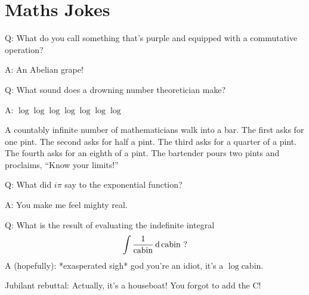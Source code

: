 \section{Maths Jokes}

Q: What do you call something that's purple and equipped with a commutative
operation?

A: An Abelian grape!

Q: What sound does a drowning number theoretician make?

A: \(\log \log \log \log \log \log \log\)

A countably infinite number of mathematicians walk into a bar.
{The first asks for one pint.
\footnotesize The second asks for half a pint.
\scriptsize The third asks for a quarter of a pint.
\tiny The fourth asks for an eighth of a pint.}
The bartender pours two pints and proclaims, ``Know your limits!''

Q: What did \(i \pi\) say to the exponential function?

A: You make me feel mighty real.

Q: What is the result of evaluating the indefinite integral
\begin{equation*}
 \integ{\frac 1{\mathrm{cabin}}}{\,\mathrm{cabin}} \ \text?
\end{equation*}
A (hopefully): *exasperated sigh* god you're an idiot, it's a
\(\log \mathrm{cabin}\).

Jubilant rebuttal: Actually, it's a houseboat! You forgot to add the C!
